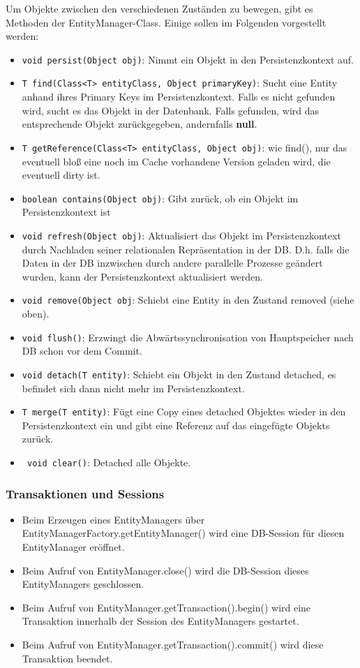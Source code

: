 Um Objekte zwischen den verschiedenen Zuständen zu bewegen, gibt es Methoden der EntityManager-Class. Einige sollen im Folgenden vorgestellt werden:
\begin{itemize}
    \item \lstinline{void persist(Object obj)}: Nimmt ein Objekt in den Persistenzkontext auf.
    \item \lstinline{T find(Class<T> entityClass, Object primaryKey)}: Sucht eine Entity anhand ihres Primary Keys im Persistenzkontext. Falls es nicht gefunden wird, sucht es das Objekt in der Datenbank. Falls gefunden, wird das entsprechende Objekt zurückgegeben, andernfalls \textbf{null}.
    \item \lstinline{T getReference(Class<T> entityClass, Object obj)}: wie find(), nur das eventuell bloß eine noch im Cache vorhandene Version geladen wird, die eventuell dirty ist.
    \item \lstinline{boolean contains(Object obj)}: Gibt zurück, ob ein Objekt im Persistenzkontext ist
    \item \lstinline{void refresh(Object obj)}: Aktualisiert das Objekt im Persistenzkontext durch Nachladen seiner relationalen Repräsentation in der DB. D.h. falls die Daten in der DB inzwischen durch andere parallelle Prozesse geändert wurden, kann der Persistenzkontext aktualisiert werden.
    \item \lstinline{void remove(Object obj}: Schiebt eine Entity in den Zustand removed (siehe oben).
    \item \lstinline{void flush()}: Erzwingt die Abwärtssynchronisation von Hauptspeicher nach DB schon vor dem Commit.
    \item \lstinline{void detach(T entity)}: Schiebt ein Objekt in den Zustand detached, es befindet sich dann nicht mehr im Persistenzkontext.
    \item \lstinline{T merge(T entity)}: Fügt eine Copy eines detached Objektes wieder in den Persistenzkontext ein und gibt eine Referenz auf das eingefügte Objekts zurück.
    \item \lstinline{ void clear()}: Detached alle Objekte.
\end{itemize}

\subsubsection{Transaktionen und Sessions}
\begin{itemize}
    \item Beim Erzeugen eines EntityManagers über EntityManagerFactory.getEntityManager() wird eine DB-Session für diesen EntityManager eröffnet.
    \item Beim Aufruf von EntityManager.close() wird die DB-Session dieses EntityManagers geschlossen.
    \item Beim Aufruf von EntityManager.getTransaction().begin() wird eine Transaktion innerhalb der Session des EntityManagers gestartet.
    \item Beim Aufruf von EntityManager.getTransaction().commit() wird diese Transaktion beendet.
\end{itemize}

